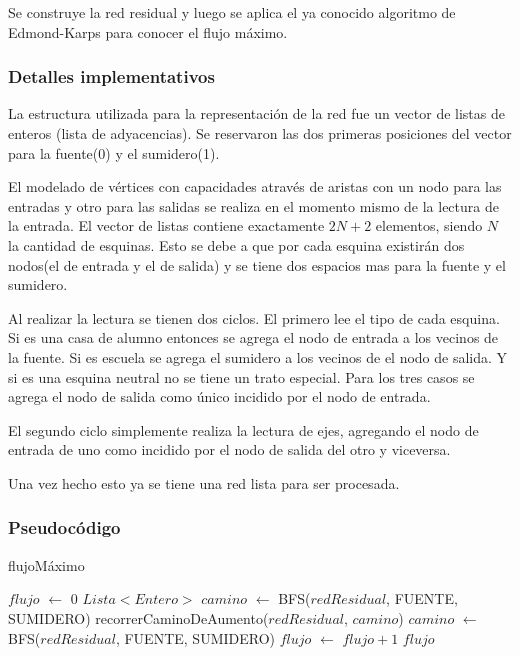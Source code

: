 Se construye la red residual y luego se aplica el ya conocido algoritmo de Edmond-Karps para conocer el flujo máximo.

\subsubsection*{Detalles implementativos}

La estructura utilizada para la representación de la red fue un vector de listas de enteros (lista de adyacencias). Se reservaron las dos primeras posiciones del vector para la fuente(0) y el sumidero(1).

El modelado de vértices con capacidades através de aristas con un nodo para las entradas y otro para las salidas se realiza en el momento mismo de la lectura de la entrada. El vector de listas contiene exactamente $2N + 2$ elementos, siendo $N$ la cantidad de esquinas. Esto se debe a que por cada esquina existirán dos nodos(el de entrada y el de salida) y se tiene dos espacios mas para la fuente y el sumidero.

Al realizar la lectura se tienen dos ciclos. El primero lee el tipo de cada esquina. Si es una casa de alumno entonces se agrega el nodo de entrada a los vecinos de la fuente. Si es escuela se agrega el sumidero a los vecinos de el nodo de salida. Y si es una esquina neutral no se tiene un trato especial. Para los tres casos se agrega el nodo de salida como único incidido por el nodo de entrada.

El segundo ciclo simplemente realiza la lectura de ejes, agregando el nodo de entrada de uno como incidido por el nodo de salida del otro y viceversa.

Una vez hecho esto ya se tiene una red lista para ser procesada.

\subsubsection*{Pseudocódigo}


\begin{algorithm}[]
	\caption{flujoMáximo}

	$flujo$ $\gets$ 0 \;
	$Lista<Entero>$ $camino$ $\gets$ BFS($redResidual$, FUENTE, SUMIDERO) \;
	 {
		recorrerCaminoDeAumento($redResidual$, $camino$) \;
		$camino$ $\gets$ BFS($redResidual$, FUENTE, SUMIDERO) \;
		$flujo$ $\gets$ $flujo + 1$ \;
	}
	\Return $flujo$ \;
\end{algorithm}

